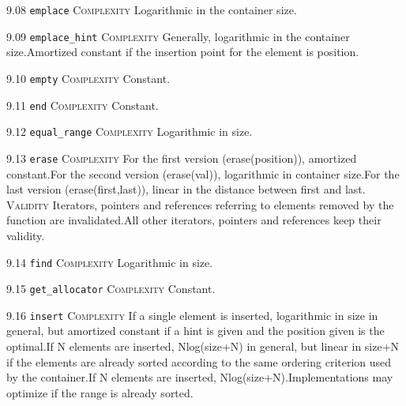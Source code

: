 \noindent\textcolor{clime}{9.08 \texttt{emplace}} \textsc{Complexity} Logarithmic in the container size. \vspace{0.5em}

\noindent\textcolor{clime}{9.09 \texttt{emplace\_hint}} \textsc{Complexity} Generally, logarithmic in the container size.Amortized constant if the insertion point for the element is position. \vspace{0.5em}

\noindent\textcolor{cgreen}{9.10 \texttt{empty}} \textsc{Complexity} Constant. \vspace{0.5em}

\noindent\textcolor{cgreen}{9.11 \texttt{end}} \textsc{Complexity} Constant. \vspace{0.5em}

\noindent\textcolor{clime}{9.12 \texttt{equal\_range}} \textsc{Complexity} Logarithmic in size. \vspace{0.5em}

\noindent\textcolor{corange}{9.13 \texttt{erase}} \textsc{Complexity} For the first version (erase(position)), amortized constant.For the second version (erase(val)), logarithmic in container size.For the last version (erase(first,last)), linear in the distance between first and last. \textsc{Validity} Iterators, pointers and references referring to elements removed by the function are invalidated.All other iterators, pointers and references keep their validity.\vspace{0.5em}

\noindent\textcolor{clime}{9.14 \texttt{find}} \textsc{Complexity} Logarithmic in size. \vspace{0.5em}

\noindent\textcolor{cgreen}{9.15 \texttt{get\_allocator}} \textsc{Complexity} Constant. \vspace{0.5em}

\noindent\textcolor{corange}{9.16 \texttt{insert}} \textsc{Complexity} If a single element is inserted, logarithmic in size in general, but amortized constant if a hint is given and the position given is the optimal.If N elements are inserted, Nlog(size+N) in general, but linear in size+N if the elements are already sorted according to the same ordering criterion used by the container.If N elements are inserted, Nlog(size+N).Implementations may optimize if the range is already sorted. \vspace{0.5em}

